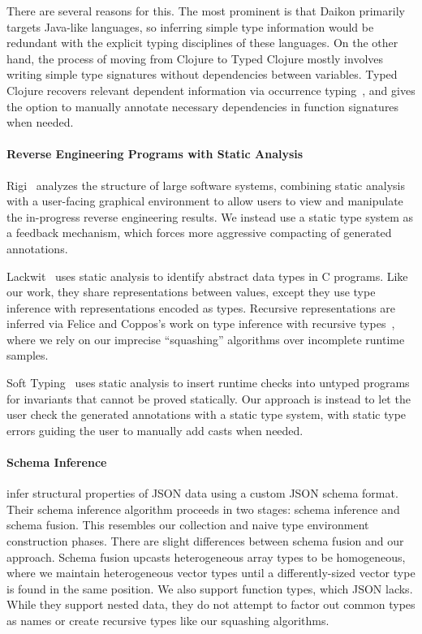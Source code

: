 There are several reasons for this. The most prominent is that Daikon
primarily targets Java-like languages, so inferring simple type information
would be redundant with the explicit typing disciplines of these languages.
On the other hand, the process of moving from Clojure to Typed Clojure
mostly involves writing simple type signatures without dependencies
between variables. Typed Clojure recovers relevant dependent information
via occurrence typing~, and gives the option to manually annotate necessary
dependencies in function signatures when needed.

\paragraph{Reverse Engineering Programs with Static Analysis}
Rigi~ analyzes
the structure of large software systems,
combining static analysis 
with a user-facing graphical environment to allow users to view and manipulate
the in-progress reverse engineering results.
We instead use a static type system as a feedback mechanism,
which forces more aggressive compacting of generated annotations.

Lackwit~ uses static analysis to identify abstract 
data types in C programs. Like our work, they share representations between
values, except they use type inference with representations encoded as types.
Recursive representations are inferred via Felice and Coppos's
work on type inference with recursive types~,
where we rely on our imprecise ``squashing'' algorithms over incomplete runtime samples.

Soft Typing~ uses static analysis to insert runtime checks into untyped
programs for invariants that cannot be proved statically. Our approach is instead to let
the user check the generated annotations with a static type system, with static type errors
guiding the user to manually add casts when needed.

\paragraph{Schema Inference}
infer structural properties of JSON data using a custom JSON schema format.
Their schema inference algorithm proceeds in two stages:
schema inference and schema fusion.
This resembles our collection and naive type environment construction phases.
There are slight differences between schema fusion and our approach.
Schema fusion upcasts heterogeneous array types to be homogeneous, where
we maintain heterogeneous vector types until a differently-sized
vector type is found in the same position.
We also support function types, which JSON lacks.
While they support nested data, they do not attempt to factor out common types as names
or create recursive types like our squashing algorithms.

